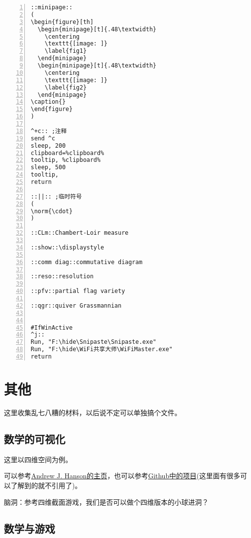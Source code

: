 \documentclass[11pt]{amsart}
\begin{document}
\begin{lstlisting}[numbers=left,numberstyle=\tiny,numbersep=10pt]
::minipage::
(
\begin{figure}[th]
  \begin{minipage}[t]{.48\textwidth}
    \centering
    \texttt{[image: ]}
    \label{fig1}
  \end{minipage}
  \begin{minipage}[t]{.48\textwidth}
    \centering
    \texttt{[image: ]}
    \label{fig2}
  \end{minipage}
\caption{}
\end{figure}
)

^+c:: ;注释
send ^c
sleep, 200
clipboard=%clipboard%
tooltip, %clipboard%
sleep, 500
tooltip,
return

::||:: ;临时符号
(
\norm{\cdot} 
)

::CLm::Chambert-Loir measure

::show::\displaystyle

::comm diag::commutative diagram

::reso::resolution

::pfv::partial flag variety

::qgr::quiver Grassmannian


#IfWinActive
^j::  
Run, "F:\hide\Snipaste\Snipaste.exe"
Run, "F:\hide\WiFi共享大师\WiFiMaster.exe"
return

\end{lstlisting}

\section{其他}
这里收集乱七八糟的材料，以后说不定可以单独搞个文件。
\subsection{数学的可视化}
这里以四维空间为例。

可以参考\href{https://legacy.cs.indiana.edu/~hansona/}{Andrew J. Hanson的主页}，也可以参考\href{https://github.com/wxyhly/4dViewer}{Github中的项目}(这里面有很多可以了解到的就不引用了)。

脑洞：参考四维截面游戏，我们是否可以做个四维版本的小球进洞？

\subsection{数学与游戏}
\end{document}
